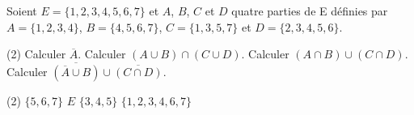\documentclass{article}
\newcommand*\complement{\overline}
\newcommand*\union{\cup}
\newcommand*\intersection{\cap}
\newcommand*\set[1]{\{#1\}}
\begin{document}
\begin{exercise}[subtitle=Set Calculus]
  Soient $E=\set{1,2,3,4,5,6,7}$ et $A$, $B$, $C$ et $D$ quatre parties de E
  d\'efinies par $A=\set{1,2,3,4}$, $B=\set{4,5,6,7}$, $C=\set{1,3,5,7}$ et
  $D=\set{2,3,4,5,6}$.
  \begin{tasks}(2)
    \task Calculer $\complement{A}$.
    \task Calculer $(A\union B) \intersection (C\union D)$.
    \task Calculer $(A\intersection B) \union (C\intersection D)$.
    \task Calculer $\complement{(\complement{A}\union B)} \union
      \complement{(C\intersection D)}$.
  \end{tasks}
\end{exercise}
\begin{solution}
  \begin{tasks}(2)
    \task $\set{5,6,7}$
    \task $E$
    \task $\set{3,4,5}$
    \task $\set{1,2,3,4,6,7}$
  \end{tasks}
\end{solution}
\end{document}
